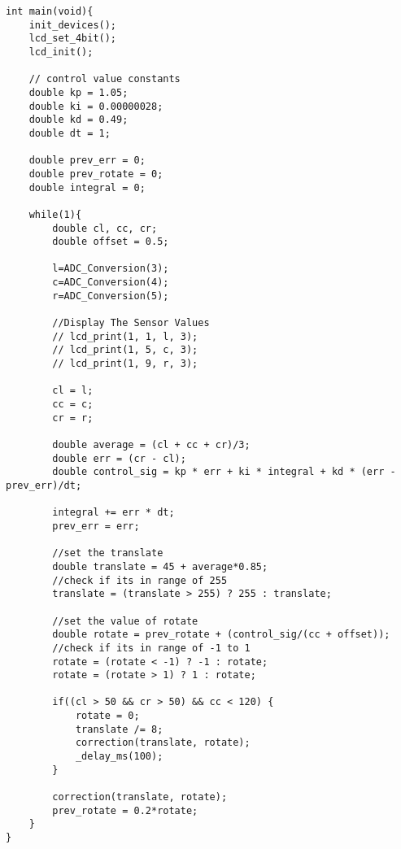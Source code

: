 \documentclass{article}
\begin{document}
\begin{tcolorbox}[title={Code for \texttt{main()} function}]
\begin{lstlisting}
int main(void){    
    init_devices();
    lcd_set_4bit();
    lcd_init();
    
    // control value constants
    double kp = 1.05;
    double ki = 0.00000028;
    double kd = 0.49;
    double dt = 1;
    
    double prev_err = 0;
    double prev_rotate = 0;
    double integral = 0;
    
    while(1){
        double cl, cc, cr;
        double offset = 0.5;
        
        l=ADC_Conversion(3);
        c=ADC_Conversion(4);
        r=ADC_Conversion(5);
        
        //Display The Sensor Values
        // lcd_print(1, 1, l, 3);
        // lcd_print(1, 5, c, 3);
        // lcd_print(1, 9, r, 3);
        
        cl = l;
        cc = c;
        cr = r;

        double average = (cl + cc + cr)/3;
        double err = (cr - cl);
        double control_sig = kp * err + ki * integral + kd * (err - prev_err)/dt;
        
        integral += err * dt;
        prev_err = err;
        
        //set the translate
        double translate = 45 + average*0.85;
        //check if its in range of 255
        translate = (translate > 255) ? 255 : translate;
        
        //set the value of rotate
        double rotate = prev_rotate + (control_sig/(cc + offset));
        //check if its in range of -1 to 1
        rotate = (rotate < -1) ? -1 : rotate;
        rotate = (rotate > 1) ? 1 : rotate;
        
        if((cl > 50 && cr > 50) && cc < 120) {
            rotate = 0;
            translate /= 8;
            correction(translate, rotate);
            _delay_ms(100);
        }
        
        correction(translate, rotate);
        prev_rotate = 0.2*rotate;
    }
}
\end{lstlisting}
\end{tcolorbox}
\end{document}
